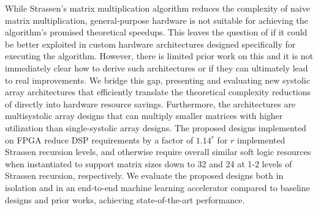While Strassen's matrix multiplication algorithm reduces the complexity of naive matrix multiplication, general-purpose hardware is not suitable for achieving the algorithm's promised theoretical speedups.
This leaves the question of if it could be better exploited in custom hardware architectures designed specifically for executing the algorithm.
However, there is limited prior work on this and it is not immediately clear how to derive such architectures or if they can ultimately lead to real improvements.
We bridge this gap, presenting and evaluating new systolic array architectures that efficiently translate the theoretical complexity reductions of \sa directly into hardware resource savings.
Furthermore, the architectures are multisystolic array designs that can multiply smaller matrices with higher utilization than single-systolic array designs.
The proposed designs implemented on FPGA reduce DSP requirements by a factor of $1.14^r$ for $r$ implemented Strassen recursion levels, and otherwise require overall similar soft logic resources when instantiated to support matrix sizes down to 32 and 24 at 1-2 levels of Strassen recursion, respectively.
We evaluate the proposed designs both in isolation and in an end-to-end machine learning accelerator compared to baseline designs and prior works, achieving state-of-the-art performance.
